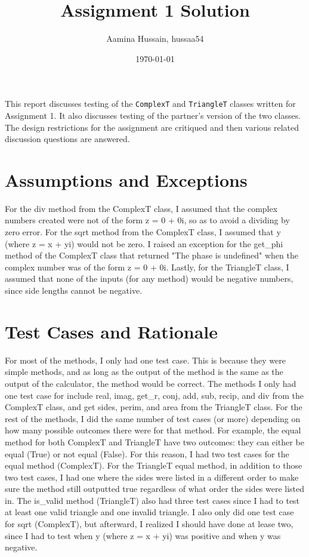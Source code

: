 \documentclass[12pt]{article}
\title{Assignment 1 Solution}
\author{Aamina Hussain, hussaa54}
\date{\today}
\begin{document}
\maketitle

This report discusses testing of the \verb|ComplexT| and \verb|TriangleT|
classes written for Assignment 1. It also discusses testing of the partner's
version of the two classes. The design restrictions for the assignment
are critiqued and then various related discussion questions are answered.

\section{Assumptions and Exceptions} \label{AssumptAndExcept}

For the div method from the ComplexT class, I assumed that the complex numbers created were not of the form z = 0 + 0i, so as to avoid a dividing by zero error. For the sqrt method from the ComplexT class, I assumed that y (where z = x + yi) would not be zero. I raised an exception for the get\_phi method of the ComplexT class that returned "The phase is undefined" when the complex number was of the form z = 0 + 0i. Lastly, for the TriangleT class, I assumed that none of the inputs (for any method) would be negative numbers, since side lengths cannot be negative.

\section{Test Cases and Rationale} \label{Testing}

For most of the methods, I only had one test case. This is because they were simple methods, and as long as the output of the method is the same as the output of the calculator, the method would be correct. The methods I only had one test case for include real, imag, get\_r, conj, add, sub, recip, and div from the ComplexT class, and get sides, perim, and area from the TriangleT class. For the rest of the methods, I did the same number of test cases (or more) depending on how many possible outcomes there were for that method. For example, the equal method for both ComplexT and TriangleT have two outcomes: they can either be equal (True) or not equal (False). For this reason, I had two test cases for the equal method (ComplexT). For the TriangleT equal method, in addition to those two test cases, I had one where the sides were listed in a different order to make sure the method still outputted true regardless of what order the sides were listed in. The is\_valid method (TriangleT) also had three test cases since I had to test at least one valid triangle and one invalid triangle. I also only did one test case for sqrt (ComplexT), but afterward, I realized I should have done at lease two, since I had to test when y (where z = x + yi) was positive and when y was negative. 
\end{document}
